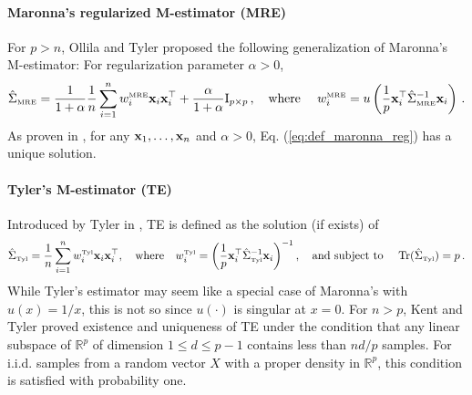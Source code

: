 \documentclass[times,sort&compress,3p]{elsarticle}
\begin{document}
 \paragraph{Maronna's regularized M-estimator (MRE)} For \(p>n\), Ollila and Tyler \cite{ollila2014regularized} proposed the following generalization of Maronna's M-estimator:
 For regularization parameter $\alpha>0$,
 \begin{equation}
 \label{eq:def_maronna_reg}
 \hat{\Sigma}_{\mbox{\tiny{MRE}}} = \frac{1}{1+\alpha}\frac{1}{n}\sum_{i=1}^{n} w^{\mbox{\tiny{MRE}}}_i {\bf x}_i {\bf x}_i^{\top} + \frac{\alpha}{1+\alpha} \mathrm{I}_{p \times p} \,,
 \quad
 \textrm{where }
 \quad 
 w^{\mbox{\tiny{MRE}}}_i = u \left( \frac{1}{p}{\bf x}_i^{\top} \hat{\Sigma}_{\mbox{\tiny{MRE}}}^{-1} {\bf x}_i \right) \,.
 \end{equation}
 As proven in \cite[Theorem 1]{ollila2014regularized}, for any ${\bf x}_1,\ldots,{\bf x}_n$
 and $\alpha>0$, 
 Eq. (\ref{eq:def_maronna_reg})
 has a unique solution.
 
 


\paragraph{Tyler's M-estimator (TE)}
Introduced by Tyler
in \cite{tyler1987distribution}, TE is defined as the solution (if exists) of 
\begin{equation}\label{eq:def_tyler}
\hat{\Sigma}_{\mbox{\tiny{Tyl}}} = \frac{1}{n}\sum_{i=1}^{n}w^{\mbox{\tiny{Tyl}}}_i {\bf x}_i{\bf x}_i^\top, 
\quad
\textrm{where}
\quad
w^{\mbox{\tiny{Tyl}}}_i = \left(\frac1p {\bf x}^\top_i\hat{\Sigma}_{\mbox{\tiny{Tyl}}}^{-1}{\bf x}_i\right)^{-1},
\quad
\textrm{and subject to }
\quad
\textrm{Tr}(\hat{\Sigma}_{\mbox{\tiny{Tyl}}}) = p\,.
\end{equation}
While Tyler's estimator may seem like a special case of Maronna's with $u(x)=1/x$, this is not so since $u(\cdot)$ is singular at $x=0$.
For $n>p$, 
Kent and Tyler \cite[Theorems 1 and 2]{kent1988maximum} 
proved 
existence and uniqueness of 
TE
under 
the condition that any linear subspace of \(\mathbb{R}^p\) of dimension $1\leq d\leq p-1$  contains less than $nd/p$ samples. 
For i.i.d. samples from a
random vector $X$ with a proper density in $\mathbb{R}^p$, this condition is satisfied with probability one. 
\end{document}
